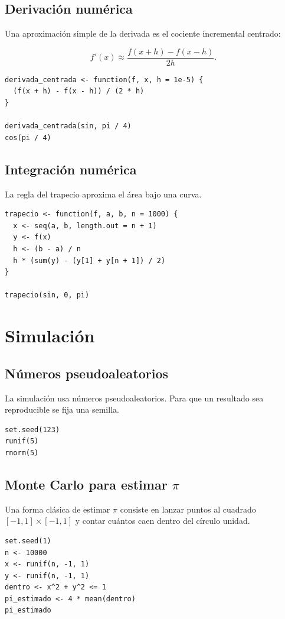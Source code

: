 \documentclass[11pt,a4paper,oneside]{book}
\begin{document}
\section{Derivación numérica}
Una aproximación simple de la derivada es el cociente incremental centrado:

\[
f'(x) \approx \frac{f(x+h)-f(x-h)}{2h}.
\]

\begin{lstlisting}[style=rstyle]
derivada_centrada <- function(f, x, h = 1e-5) {
  (f(x + h) - f(x - h)) / (2 * h)
}

derivada_centrada(sin, pi / 4)
cos(pi / 4)
\end{lstlisting}

\section{Integración numérica}
La regla del trapecio aproxima el área bajo una curva.

\begin{lstlisting}[style=rstyle]
trapecio <- function(f, a, b, n = 1000) {
  x <- seq(a, b, length.out = n + 1)
  y <- f(x)
  h <- (b - a) / n
  h * (sum(y) - (y[1] + y[n + 1]) / 2)
}

trapecio(sin, 0, pi)
\end{lstlisting}

\chapter{Simulación}

\section{Números pseudoaleatorios}
La simulación usa números pseudoaleatorios. Para que un resultado sea reproducible se fija una semilla.

\begin{lstlisting}[style=rstyle]
set.seed(123)
runif(5)
rnorm(5)
\end{lstlisting}

\section{Monte Carlo para estimar \texorpdfstring{$\pi$}{pi}}
Una forma clásica de estimar \(\pi\) consiste en lanzar puntos al cuadrado \([-1,1]\times[-1,1]\) y contar cuántos caen dentro del círculo unidad.

\begin{lstlisting}[style=rstyle]
set.seed(1)
n <- 10000
x <- runif(n, -1, 1)
y <- runif(n, -1, 1)
dentro <- x^2 + y^2 <= 1
pi_estimado <- 4 * mean(dentro)
pi_estimado
\end{lstlisting}
\end{document}
